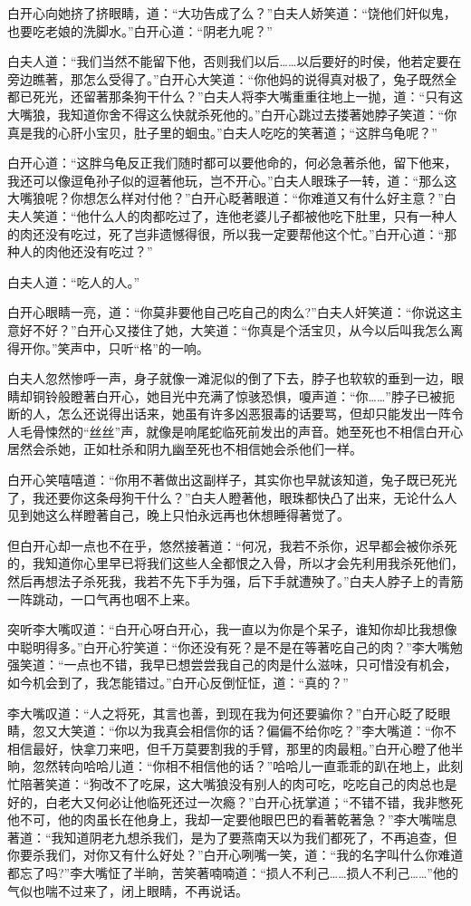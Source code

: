 \documentclass[12pt,oneside]{book}
\begin{document}
白开心向她挤了挤眼睛，道：``大功告成了么？''白夫人娇笑道：``饶他们奸似鬼，也要吃老娘的洗脚水。''白开心道：``阴老九呢？''

白夫人道：``我们当然不能留下他，否则我们以后\ldots\ldots 以后要好的时侯，他若定要在旁边瞧著，那怎么受得了。''白开心大笑道：``你他妈的说得真对极了，兔子既然全都已死光，还留著那条狗干什么？''白夫人将李大嘴重重往地上一抛，道：``只有这大嘴狼，我知道你舍不得这么快就杀死他的。''白开心跳过去搂著她脖子笑道：``你真是我的心肝小宝贝，肚子里的蛔虫。''白夫人吃吃的笑著道；``这胖乌龟呢？''

白开心道：``这胖乌龟反正我们随时都可以要他命的，何必急著杀他，留下他来，我还可以像逗龟孙子似的逗著他玩，岂不开心。''白夫人眼珠子一转，道：``那么这大嘴狼呢？你想怎么样对付他？''白开心眨著眼道：``你难道又有什么好主意？''白夫人笑道：``他什么人的肉都吃过了，连他老婆儿子都被他吃下肚里，只有一种人的肉还没有吃过，死了岂非遗憾得很，所以我一定要帮他这个忙。''白开心道：``那种人的肉他还没有吃过？''

白夫人道：``吃人的人。''

白开心眼睛一亮，道：``你莫非要他自己吃自己的肉么?''白夫人奸笑道：``你说这主意好不好？''白开心又搂住了她，大笑道：``你真是个活宝贝，从今以后叫我怎么离得开你。''笑声中，只听``格''的一响。

白夫人忽然惨呼一声，身子就像一滩泥似的倒了下去，脖子也软软的垂到一边，眼睛却铜铃般瞪著白开心，她目光中充满了惊骇恐惧，嗄声道：``你\ldots\ldots{}''脖子已被扼断的人，怎么还说得出话来，她虽有许多凶恶狠毒的话要骂，但却只能发出一阵令人毛骨悚然的``丝丝''声，就像是响尾蛇临死前发出的声音。她至死也不相信白开心居然会杀她，正如杜杀和阴九幽至死也不相信她会杀他们一样。

白开心笑嘻嘻道：``你用不著做出这副样子，其实你也早就该知道，兔子既已死光了，我还要你这条母狗干什么？''白夫人瞪著他，眼珠都快凸了出来，无论什么人见到她这么样瞪著自己，晚上只怕永远再也休想睡得著觉了。

但白开心却一点也不在乎，悠然接著道：``何况，我若不杀你，迟早都会被你杀死的，我知道你心里早已将我们这些人全都恨之入骨，所以才会先利用我杀死他们，然后再想法子杀死我，我若不先下手为强，后下手就遭殃了。''白夫人脖子上的青筋一阵跳动，一口气再也咽不上来。

突听李大嘴叹道：``白开心呀白开心，我一直以为你是个呆子，谁知你却比我想像中聪明得多。''白开心狞笑道：``你还没有死？是不是在等著吃自己的肉？''李大嘴勉强笑道：``一点也不错，我早已想尝尝我自己的肉是什么滋味，只可惜没有机会，如今机会到了，我怎能错过。''白开心反倒怔怔，道：``真的？''

李大嘴叹道：``人之将死，其言也善，到现在我为何还要骗你？''白开心眨了眨眼睛，忽又大笑道：``你以为我真会相信你的话？偏偏不给你吃？''李大嘴道：``你不相信最好，快拿刀来吧，但千万莫要割我的手臂，那里的肉最粗。''白开心瞪了他半晌，忽然转向哈哈儿道：``你相不相信他的话？''哈哈儿一直乖乖的趴在地上，此刻忙陪著笑道：``狗改不了吃屎，这大嘴狼没有别人的肉可吃，吃吃自己的肉总也是好的，白老大又何必让他临死还过一次瘾？''白开心抚掌道；``不错不错，我非憋死他不可，他的肉虽长在他身上，我却一定要他眼巴巴的看著乾著急？''李大嘴喘息著道：``我知道阴老九想杀我们，是为了要燕南天以为我们都死了，不再追查，但你要杀我们，对你又有什么好处？''白开心咧嘴一笑，道：``我的名字叫什么你难道都忘了吗?''李大嘴怔了半晌，苦笑著喃喃道：``损人不利己\ldots\ldots 损人不利己\ldots\ldots{}''他的气似也喘不过来了，闭上眼睛，不再说话。
\end{document}
